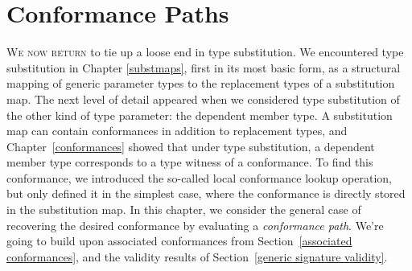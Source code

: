 \documentclass[../generics]{subfiles}
\begin{document}
\newcommand{\NormalConformance}[4]{
\begin{tabular}{|lcl|}
\hline
\multicolumn{3}{|l|}{\texttt{#1:\ #2}}\\
\hline
\rule{0pt}{3ex}\textbf{Associated type}&&\textbf{Type witness}\\
#3\\[\medskipamount]
\textbf{Conformance requirement}&&\textbf{Conformance}\\
#4\\[\medskipamount]
\hline
\end{tabular}
}
\newcommand{\AssocTypeDef}[2]{$\AssocType{#1}$&$\mapsto$&\texttt{#2}}
\newcommand{\AssocConfDef}[3]{$\AssocConf{#1}{#3}$&$\mapsto$&\ConfReq{#2}{#3}}

\chapter{Conformance Paths}\label{conformance paths}

\lettrine{W}{e now return} to tie up a loose end in type substitution. We encountered type substitution in Chapter \ref{substmaps}, first in its most basic form, as a structural mapping of generic parameter types to the replacement types of a substitution map. The next level of detail appeared when we considered type substitution of the other kind of type parameter: the dependent member type. A substitution map can contain conformances in addition to replacement types, and Chapter~\ref{conformances} showed that under type substitution, a dependent member type corresponds to a type witness of a conformance. To find this conformance, we introduced the so-called local conformance lookup operation, but only defined it in the simplest case, where the conformance is directly stored in the substitution map. In this chapter, we consider the general case of recovering the desired conformance by evaluating a \emph{conformance path}. We're going to build upon associated conformances from Section~\ref{associated conformances}, and the validity results of Section~\ref{generic signature validity}.
\end{document}
